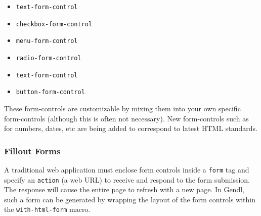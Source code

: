 \documentclass [11pt]{book}
\begin{document}
\begin{itemize}

\item \texttt{text-form-control}

\item \texttt{checkbox-form-control}

\item \texttt{menu-form-control}

\item \texttt{radio-form-control}

\item \texttt{text-form-control}

\item \texttt{button-form-control}

\end{itemize}





These form-controls are customizable by mixing them into
	   your own specific form-controls (although this is often not
	   necessary). New form-controls such as for numbers, dates,
	   etc are being added to correspond to latest HTML
	   standards.



\subsubsection{Fillout Forms}

\label{subsubsec:filloutforms}



A traditional web application must enclose form controls inside a \texttt{form} tag and specify an \texttt{action} (a web URL) to receive and respond to the 
form submission. The response will cause the entire page to refresh with
a new page. In Gendl, such a form can be generated by wrapping the layout
of the form controls within the \texttt{with-html-form} macro.
\end{document}
